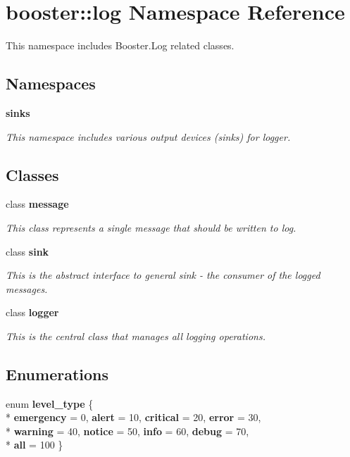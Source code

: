 \section{booster\-:\-:log Namespace Reference}
\label{namespacebooster_1_1log}


This namespace includes Booster.\-Log related classes.  


\subsection*{Namespaces}
\begin{DoxyCompactItemize}
\item 
{\bf sinks}
\begin{DoxyCompactList}\small\item\em This namespace includes various output devices (sinks) for logger. \end{DoxyCompactList}\end{DoxyCompactItemize}
\subsection*{Classes}
\begin{DoxyCompactItemize}
\item 
class {\bf message}
\begin{DoxyCompactList}\small\item\em This class represents a single message that should be written to log. \end{DoxyCompactList}\item 
class {\bf sink}
\begin{DoxyCompactList}\small\item\em This is the abstract interface to general sink -\/ the consumer of the logged messages. \end{DoxyCompactList}\item 
class {\bf logger}
\begin{DoxyCompactList}\small\item\em This is the central class that manages all logging operations. \end{DoxyCompactList}\end{DoxyCompactItemize}
\subsection*{Enumerations}
\begin{DoxyCompactItemize}
\item 
enum {\bf level\-\_\-type} \{ \\*
{\bfseries emergency} = 0, 
{\bfseries alert} = 10, 
{\bfseries critical} = 20, 
{\bfseries error} = 30, 
\\*
{\bfseries warning} = 40, 
{\bfseries notice} = 50, 
{\bfseries info} = 60, 
{\bfseries debug} = 70, 
\\*
{\bfseries all} = 100
 \}
\end{DoxyCompactItemize}


